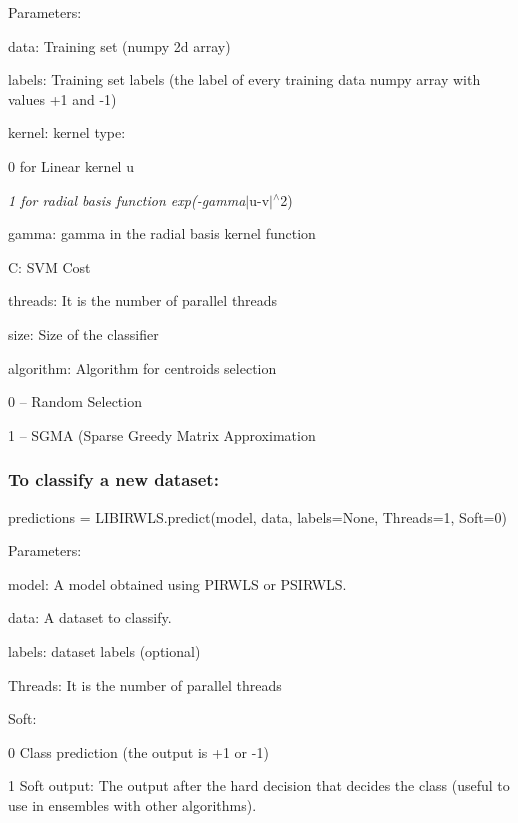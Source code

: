 Parameters\+:
\begin{DoxyItemize}
\item data\+: Training set (numpy 2d array)
\item labels\+: Training set labels (the label of every training data numpy array with values +1 and -\/1)
\item kernel\+: kernel type\+:
\begin{DoxyItemize}
\item 0 for Linear kernel u
\item {\itshape 1 for radial basis function exp(-\/gamma}$\vert$u-\/v$\vert$$^\wedge$2)
\end{DoxyItemize}
\item gamma\+: gamma in the radial basis kernel function
\item C\+: S\+VM Cost
\item threads\+: It is the number of parallel threads
\item size\+: Size of the classifier
\item algorithm\+: Algorithm for centroids selection
\begin{DoxyItemize}
\item 0 -- Random Selection
\item 1 -- S\+G\+MA (Sparse Greedy Matrix Approximation
\end{DoxyItemize}
\end{DoxyItemize}

\subsubsection*{To classify a new dataset\+:}

\begin{DoxyVerb}    predictions = LIBIRWLS.predict(model, data, labels=None, Threads=1, Soft=0)
\end{DoxyVerb}


Parameters\+:
\begin{DoxyItemize}
\item model\+: A model obtained using P\+I\+R\+W\+LS or P\+S\+I\+R\+W\+LS.
\item data\+: A dataset to classify.
\item labels\+: dataset labels (optional)
\item Threads\+: It is the number of parallel threads
\item Soft\+:
\begin{DoxyItemize}
\item 0 Class prediction (the output is +1 or -\/1)
\item 1 Soft output\+: The output after the hard decision that decides the class (useful to use in ensembles with other algorithms).
\end{DoxyItemize}
\end{DoxyItemize}

